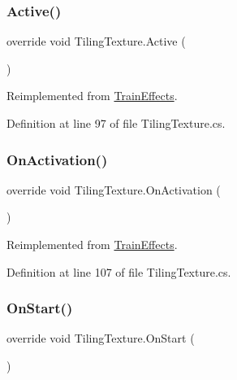 \subsubsection{\texorpdfstring{Active()}{Active()}}
{\footnotesize\ttfamily override void Tiling\+Texture.\+Active (\begin{DoxyParamCaption}{ }\end{DoxyParamCaption})\hspace{0.3cm}{\ttfamily [virtual]}}



Reimplemented from \mbox{\hyperlink{class_train_effects_a444cb0c6444a8945f5e1a7f02dc83b99}{Train\+Effects}}.



Definition at line 97 of file Tiling\+Texture.\+cs.

\mbox{\label{class_tiling_texture_a83ea89d5d92568bd86a0c5bd22a3bb41}} 
\subsubsection{\texorpdfstring{On\+Activation()}{OnActivation()}}
{\footnotesize\ttfamily override void Tiling\+Texture.\+On\+Activation (\begin{DoxyParamCaption}{ }\end{DoxyParamCaption})\hspace{0.3cm}{\ttfamily [virtual]}}



Reimplemented from \mbox{\hyperlink{class_train_effects_ad77aba799a5d19a141128639a4bebcad}{Train\+Effects}}.



Definition at line 107 of file Tiling\+Texture.\+cs.

\mbox{\label{class_tiling_texture_a1af8a5ac35ee619e0fb5db6900d725f6}} 
\subsubsection{\texorpdfstring{On\+Start()}{OnStart()}}
{\footnotesize\ttfamily override void Tiling\+Texture.\+On\+Start (\begin{DoxyParamCaption}{ }\end{DoxyParamCaption})\hspace{0.3cm}{\ttfamily [virtual]}}



